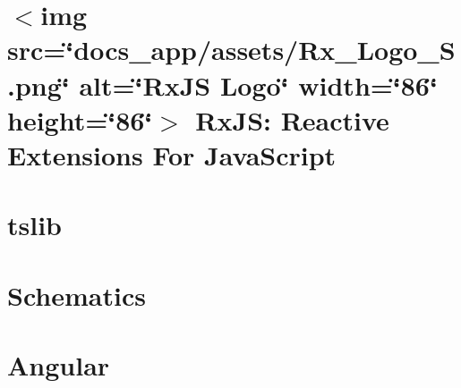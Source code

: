 \documentclass[twoside]{book}
\newcommand{\+}{\discretionary{\mbox{\scriptsize$\hookleftarrow$}}{}{}}
\begin{document}
\chapter{\texorpdfstring{$<$}{<}img src=\char`\"{}docs\+\_\+app/assets/\+Rx\+\_\+\+Logo\+\_\+\+S.\+png\char`\"{} alt=\char`\"{}\+Rx\+JS Logo\char`\"{} width=\char`\"{}86\char`\"{} height=\char`\"{}86\char`\"{}\texorpdfstring{$>$}{>} Rx\+JS\+: Reactive Extensions For Java\+Script}
\label{md__c___users_vaishnavi_jadhav__desktop__developer_code_mean_stack_example_client_node_modules__0a0ca87cafd6d4e54a23b0e1d02d5092}

\chapter{tslib}
\label{md__c___users_vaishnavi_jadhav__desktop__developer_code_mean_stack_example_client_node_modules__3c3c81a1437543eb8f0ec1a95873d528}

\chapter{Schematics}
\label{md__c___users_vaishnavi_jadhav__desktop__developer_code_mean_stack_example_client_node_modules__469c10b6d48ca3a63d878c0b9658be8d}

\chapter{Angular}
\label{md__c___users_vaishnavi_jadhav__desktop__developer_code_mean_stack_example_client_node_modules__angular_animations__r_e_a_d_m_e}

\end{document}
